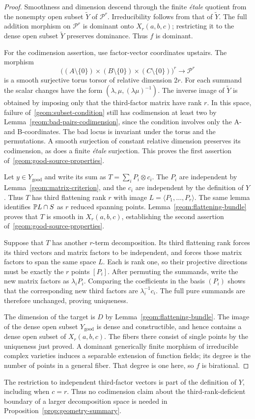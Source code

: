 \begin{proof}
Smoothness and dimension descend through the finite \emph{\'etale}
quotient from the nonempty open subset $\widetilde Y$ of
$\mathcal P^r$. Irreducibility follows from that of
$\widetilde Y$. The full addition morphism on $\mathcal P^r$
is dominant onto $X_r(a,b,c)$; restricting it to the dense open
subset $\widetilde Y$ preserves dominance. Thus $f$ is dominant.

For the codimension assertion, use factor-vector coordinates
upstairs. The morphism
\[
 \bigl((A\setminus\{0\})\times(B\setminus\{0\})
                      \times(C\setminus\{0\})\bigr)^r
       \longrightarrow\mathcal P^r
\]
is a smooth surjective torus torsor of relative dimension $2r$.
For each summand the scalar changes have the form
$(\lambda,\mu,(\lambda\mu)^{-1})$. The inverse image of
$\widetilde Y$ is obtained by imposing only that the third-factor
matrix have rank $r$. In this space, failure
of~\eqref{geom:subset-condition} still has codimension at least
two by Lemma~\ref{geom:bad-pairs-codimension}, since the condition
involves only the A- and B-coordinates. The bad locus is invariant
under the torus and the permutations. A smooth surjection of
constant relative dimension preserves its codimension, as does a
finite \emph{\'etale} surjection. This proves the first assertion
of~\eqref{geom:good-source-properties}.

Let $y\in Y_{\mathrm{good}}$ and write its sum as
$T=\sum_i P_i\otimes c_i$. The $P_i$ are independent by
Lemma~\ref{geom:matrix-criterion}, and the $c_i$ are independent
by the definition of $Y$. Thus $T$ has third flattening rank $r$
with image $L=\langle P_1,\ldots,P_r\rangle$. The same lemma
identifies $\mathbb P L\cap S$ as $r$ reduced spanning points.
Lemma~\ref{geom:flattening-bundle} proves that $T$ is smooth in
$X_r(a,b,c)$, establishing the second assertion
of~\eqref{geom:good-source-properties}.

Suppose that $T$ has another $r$-term decomposition. Its third
flattening rank forces its third vectors and matrix factors to
be independent, and forces those matrix factors to span the same
space $L$. Each is rank one, so their projective directions must
be exactly the $r$ points $[P_i]$. After permuting the summands,
write the new matrix factors as $\lambda_iP_i$. Comparing the
coefficients in the basis $(P_i)$ shows that the corresponding
new third factors are $\lambda_i^{-1}c_i$. The full pure summands
are therefore unchanged, proving uniqueness.

The dimension of the target is $D$ by
Lemma~\ref{geom:flattening-bundle}. The image of the dense open
subset $Y_{\mathrm{good}}$ is dense and constructible, and hence
contains a dense open subset of $X_r(a,b,c)$. The fibers there
consist of single points by the uniqueness just proved. A
dominant generically finite morphism of irreducible complex
varieties induces a separable extension of function fields;
its degree is the number of points in a general fiber. That
degree is one here, so $f$ is birational.
\end{proof}

The restriction to independent third-factor vectors is part of the
definition of $Y$, including when $c=r$. Thus no codimension claim
about the third-rank-deficient boundary of a larger decomposition
space is needed in Proposition~\ref{prop:geometry-summary}.
